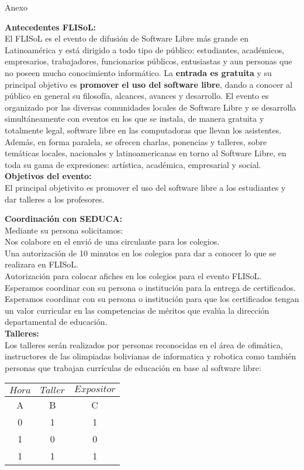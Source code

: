 \documentclass[xcolor, x11names, letterpaper, 12pt]{letter}
\begin{document}
\begin{center}
{\Huge Anexo}
\end{center}

\textbf{Antecedentes FLISoL:}\\
El FLISoL es el evento de difusión de Software Libre más grande en Latinoamérica y está dirigido a todo tipo de público: estudiantes, académicos, empresarios, trabajadores, funcionarios públicos, entusiastas y aun personas que no poseen mucho conocimiento informático. La \textbf{entrada es gratuita} y su principal objetivo es \textbf{promover el uso del software libre}, dando a conocer al público en general su filosofía, alcances, avances y desarrollo.
El evento es organizado por las diversas comunidades locales de Software Libre y se desarrolla simultáneamente con eventos en los que se instala, de manera gratuita y totalmente legal, software libre en las computadoras que llevan los asistentes. Además, en forma paralela, se ofrecen charlas, ponencias y talleres, sobre temáticas locales, nacionales y latinoamericanas en torno al Software Libre, en toda su gama de expresiones: artística, académica, empresarial y social.
\\
\textbf{Objetivos del evento:}\\
El principal objetivito es promover el uso del software libre a los estudiantes y dar talleres a los profesores.

\textbf{Coordinación con SEDUCA:}\\
Mediante su persona solicitamos:\\
Nos colabore en el envió de una circulante para los colegios.\\
Una autorización de 10 minutos en los colegios para dar a conocer lo que se realizara en FLISoL.\\
Autorización para colocar afiches en los colegios para el evento FLISoL.\\
Esperamos coordinar con su persona o institución para la entrega de certificados.\\
Esperamos coordinar con su persona o institución para que los certificados tengan un valor curricular en las competencias de méritos que evalúa la dirección departamental de educación.\\


\textbf{Talleres:}\\
Los talleres serán realizados por personas reconocidas en el área de ofimática, instructores de las olimpiadas bolivianas de informatica y robotica como también personas que  trabajan  currículas de educación en base al software libre:\\

\centering
{}
\begin{tabular}{ccc} \hline
\rowcolor{maroon!40} $Hora$ & $Taller$ & $Expositor$\\\hline
A & B & C \\
0 & 1 & 1 \\
1 & 0 & 0 \\
1 & 1 & 1 \\\hline
\end{tabular}
\end{document}
